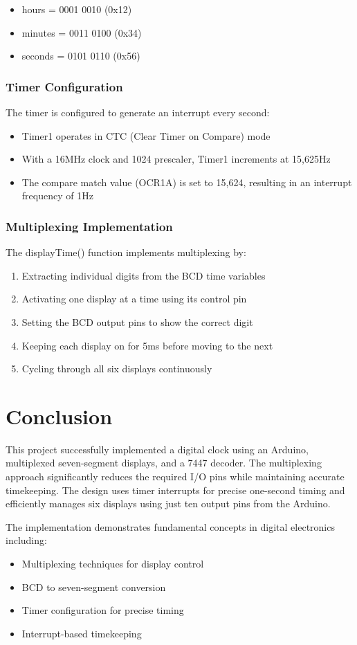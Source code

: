 \documentclass[a4paper,12pt]{article}
\begin{document}
\begin{itemize}
    \item hours = 0001 0010 (0x12)
    \item minutes = 0011 0100 (0x34)
    \item seconds = 0101 0110 (0x56)
\end{itemize}

\subsubsection{Timer Configuration}
The timer is configured to generate an interrupt every second:

\begin{itemize}
    \item Timer1 operates in CTC (Clear Timer on Compare) mode
    \item With a 16MHz clock and 1024 prescaler, Timer1 increments at 15,625Hz
    \item The compare match value (OCR1A) is set to 15,624, resulting in an interrupt frequency of 1Hz
\end{itemize}

\subsubsection{Multiplexing Implementation}
The displayTime() function implements multiplexing by:

\begin{enumerate}
    \item Extracting individual digits from the BCD time variables
    \item Activating one display at a time using its control pin
    \item Setting the BCD output pins to show the correct digit
    \item Keeping each display on for 5ms before moving to the next
    \item Cycling through all six displays continuously
\end{enumerate}

\section{Conclusion}
This project successfully implemented a digital clock using an Arduino, multiplexed seven-segment displays, and a 7447 decoder. The multiplexing approach significantly reduces the required I/O pins while maintaining accurate timekeeping. The design uses timer interrupts for precise one-second timing and efficiently manages six displays using just ten output pins from the Arduino.

The implementation demonstrates fundamental concepts in digital electronics including:
\begin{itemize}
    \item Multiplexing techniques for display control
    \item BCD to seven-segment conversion
    \item Timer configuration for precise timing
    \item Interrupt-based timekeeping
\end{itemize}
\end{document}
